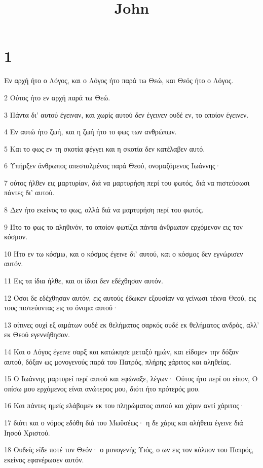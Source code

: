 

\title{John}


\chapter{1}

\par Εν αρχή ήτο ο Λόγος, και ο Λόγος ήτο παρά τω Θεώ, και Θεός ήτο ο Λόγος.
\par 2 Ούτος ήτο εν αρχή παρά τω Θεώ.
\par 3 Πάντα δι' αυτού έγειναν, και χωρίς αυτού δεν έγεινεν ουδέ εν, το οποίον έγεινεν.
\par 4 Εν αυτώ ήτο ζωή, και η ζωή ήτο το φως των ανθρώπων.
\par 5 Και το φως εν τη σκοτία φέγγει και η σκοτία δεν κατέλαβεν αυτό.
\par 6 Υπήρξεν άνθρωπος απεσταλμένος παρά Θεού, ονομαζόμενος Ιωάννης·
\par 7 ούτος ήλθεν εις μαρτυρίαν, διά να μαρτυρήση περί του φωτός, διά να πιστεύσωσι πάντες δι' αυτού.
\par 8 Δεν ήτο εκείνος το φως, αλλά διά να μαρτυρήση περί του φωτός.
\par 9 Ήτο το φως το αληθινόν, το οποίον φωτίζει πάντα άνθρωπον ερχόμενον εις τον κόσμον.
\par 10 Ήτο εν τω κόσμω, και ο κόσμος έγεινε δι' αυτού, και ο κόσμος δεν εγνώρισεν αυτόν.
\par 11 Εις τα ίδια ήλθε, και οι ίδιοι δεν εδέχθησαν αυτόν.
\par 12 Όσοι δε εδέχθησαν αυτόν, εις αυτούς έδωκεν εξουσίαν να γείνωσι τέκνα Θεού, εις τους πιστεύοντας εις το όνομα αυτού·
\par 13 οίτινες ουχί εξ αιμάτων ουδέ εκ θελήματος σαρκός ουδέ εκ θελήματος ανδρός, αλλ' εκ Θεού εγεννήθησαν.
\par 14 Και ο Λόγος έγεινε σαρξ και κατώκησε μεταξύ ημών, και είδομεν την δόξαν αυτού, δόξαν ως μονογενούς παρά του Πατρός, πλήρης χάριτος και αληθείας.
\par 15 Ο Ιωάννης μαρτυρεί περί αυτού και εφώναξε, λέγων· Ούτος ήτο περί ου είπον, Ο οπίσω μου ερχόμενος είναι ανώτερος μου, διότι ήτο πρότερός μου.
\par 16 Και πάντες ημείς ελάβομεν εκ του πληρώματος αυτού και χάριν αντί χάριτος·
\par 17 διότι και ο νόμος εδόθη διά του Μωϋσέως· η δε χάρις και αλήθεια έγεινε διά Ιησού Χριστού.
\par 18 Ουδείς είδε ποτέ τον Θεόν· ο μονογενής Υιός, ο ων εις τον κόλπον του Πατρός, εκείνος εφανέρωσεν αυτόν.
